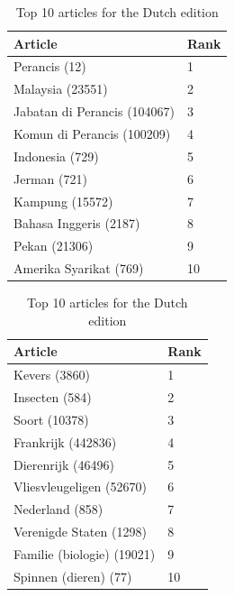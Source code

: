 \begin{table}[htbp]
    \begin{minipage}{.45\linewidth}
        \centering
        \begin{tabular}{ll}
            \toprule
            Article & Rank\\
            \midrule
            Perancis (12) & 1\\
            Malaysia (23551) & 2\\
            Jabatan di Perancis (104067) & 3\\
            Komun di Perancis (100209) & 4\\
            Indonesia (729) & 5\\
            Jerman (721) & 6\\
            Kampung (15572) & 7\\
            Bahasa Inggeris (2187) & 8\\
            Pekan (21306) & 9\\
            Amerika Syarikat (769) & 10\\
            \bottomrule
        \end{tabular}
        \caption{Top 10 articles for the Malay edition}
    \end{minipage}
    \hfill
    \begin{minipage}{.45\linewidth}
        \centering
        \begin{tabular}{ll}
            \toprule
            Article & Rank\\
            \midrule
            Kevers (3860) & 1\\
            Insecten (584) & 2\\
            Soort (10378) & 3\\
            Frankrijk (442836) & 4\\
            Dierenrijk (46496) & 5\\
            Vliesvleugeligen (52670) & 6\\
            Nederland (858) & 7\\
            Verenigde Staten (1298) & 8\\
            Familie (biologie) (19021) & 9\\
            Spinnen (dieren) (77) & 10\\
            \bottomrule
        \end{tabular}
        \caption{Top 10 articles for the Dutch edition}
    \end{minipage}
\end{table}
